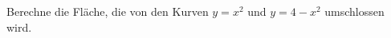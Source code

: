 \question[10] Berechne die Fläche, die von den Kurven $y = x^2$ und $y = 4 - x^2$ umschlossen wird.
